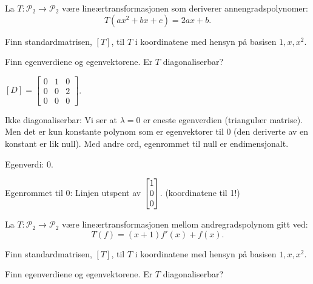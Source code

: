 \begin{oppgave}
La $T:\mathcal{P}_2\rightarrow \mathcal{P}_2$ være lineærtransformasjonen som deriverer annengradspolynomer: $$T(ax^2+bx+c)=2ax+b.$$

\begin{punkt}
Finn standardmatrisen, $[T]$, til $T$ i koordinatene med hensyn på basisen $1,x,x^2$.
\end{punkt}

\begin{punkt}
Finn egenverdiene og egenvektorene. Er $T$ diagonaliserbar?
\end{punkt}

\end{oppgave}

\begin{losning}

\begin{punkt}
$[D]=\begin{bmatrix}
0 & 1 & 0\\
0 & 0 & 2\\
0 & 0 & 0
\end{bmatrix}$.
\end{punkt}

\begin{punkt}
Ikke diagonaliserbar: Vi ser at $\lambda=0$ er eneste egenverdien (triangulær matrise). Men det er kun konstante polynom som er egenvektorer til 0 (den deriverte av en konstant er lik null). Med andre ord, egenrommet til null er endimensjonalt.
\end{punkt}

\begin{punkt}
Egenverdi: 0.

\noindent
Egenrommet til 0: Linjen utspent av $\begin{bmatrix} 1 \\ 0 \\ 0 \end{bmatrix}$. (koordinatene til 1!)
\end{punkt}
\end{losning}



\begin{oppgave}
La $T:\mathcal{P}_2\rightarrow \mathcal{P}_2$ være lineærtransformasjonen mellom andregradspolynom gitt ved: $$T(f)=(x+1)f'(x)+f(x).$$

\begin{punkt}
Finn standardmatrisen, $[T]$, til $T$ i koordinatene med hensyn på basisen $1,x,x^2$.
\end{punkt}

\begin{punkt}
Finn egenverdiene og egenvektorene. Er $T$ diagonaliserbar?
\end{punkt}
\end{oppgave}

